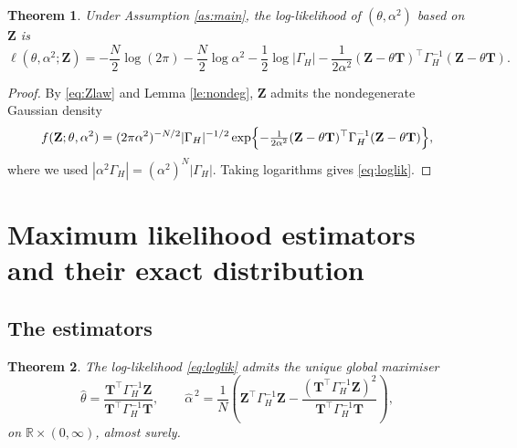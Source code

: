 \documentclass[11pt,reqno]{amsart}
\numberwithin{equation}{section}
\theoremstyle{plain}
\newtheorem{theorem}{Theorem}[section]
\theoremstyle{definition}
\theoremstyle{remark}
\newcommand{\bT}{\mathbf{T}}
\newcommand{\bZ}{\mathbf{Z}}
\newcommand{\GH}{\Gamma_H}
\newcommand{\R}{\mathbb{R}}
\begin{document}
\begin{theorem}\label{th:loglik}
Under Assumption \ref{as:main}, the log-likelihood of $(\theta,\alpha^{2})$ based on
$\bZ$ is
\begin{equation}\label{eq:loglik}
  \ell(\theta,\alpha^{2};\bZ)=-\frac N2\log(2\pi)-\frac N2\log\alpha^{2}
  -\frac12\log|\GH|-\frac{1}{2\alpha^{2}}(\bZ-\theta\bT)^{\top}\GH^{-1}(\bZ-\theta\bT).
\end{equation}
\end{theorem}

\begin{proof}
By \eqref{eq:Zlaw} and Lemma \ref{le:nondeg}, $\bZ$ admits the nondegenerate Gaussian
density
\[
  f(\bZ;\theta,\alpha^{2})=(2\pi\alpha^{2})^{-N/2}|\GH|^{-1/2}
  \exp\Bigl\{-\tfrac{1}{2\alpha^{2}}(\bZ-\theta\bT)^{\top}\GH^{-1}(\bZ-\theta\bT)\Bigr\},
\]
where we used $|\alpha^{2}\GH|=(\alpha^{2})^{N}|\GH|$. Taking logarithms gives
\eqref{eq:loglik}.
\end{proof}

\section{Maximum likelihood estimators and their exact distribution}\label{se:mle}

\subsection{The estimators}

\begin{theorem}\label{th:mle}
The log-likelihood \eqref{eq:loglik} admits the unique global maximiser
\begin{equation}\label{eq:mle}
  \widehat\theta=\frac{\bT^{\top}\GH^{-1}\bZ}{\bT^{\top}\GH^{-1}\bT},
  \qquad
  \widehat\alpha^{\,2}=\frac1N\left(\bZ^{\top}\GH^{-1}\bZ
    -\frac{(\bT^{\top}\GH^{-1}\bZ)^{2}}{\bT^{\top}\GH^{-1}\bT}\right),
\end{equation}
on $\R\times(0,\infty)$, almost surely.
\end{theorem}
\end{document}
